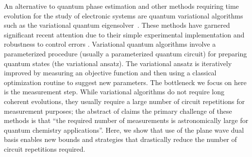 \documentclass[superscriptaddress,aps,pra,nofootinbib,notitlepage,10pt,longbibliography]{revtex4-1}
\begin{document}
An alternative to quantum phase estimation and other methods requiring time evolution for the study of electronic systems are quantum variational algorithms such as the variational quantum eigensolver~\cite{Peruzzo2013,McClean2015,McClean2016}.  These methods have garnered significant recent attention due to their simple experimental implementation and robustness to control errors \cite{OMalley2016}. Variational quantum algorithms involve a parameterized procedure (usually a parameterized quantum circuit) for preparing quantum states (the variational ansatz). The variational ansatz is iteratively improved by measuring an objective function and then using a classical optimization routine to suggest new parameters. The bottleneck we focus on here is the measurement step. While variational algorithms do not require long coherent evolutions, they usually require a large number of circuit repetitions for measurement purposes; the abstract of \cite{Wecker2015a} claims the primary challenge of these methods is that ``the required number of measurements is astronomically large for quantum chemistry applications''. Here, we show that use of the plane wave dual basis enables new bounds and strategies that drastically reduce the number of circuit repetitions required.
\end{document}
